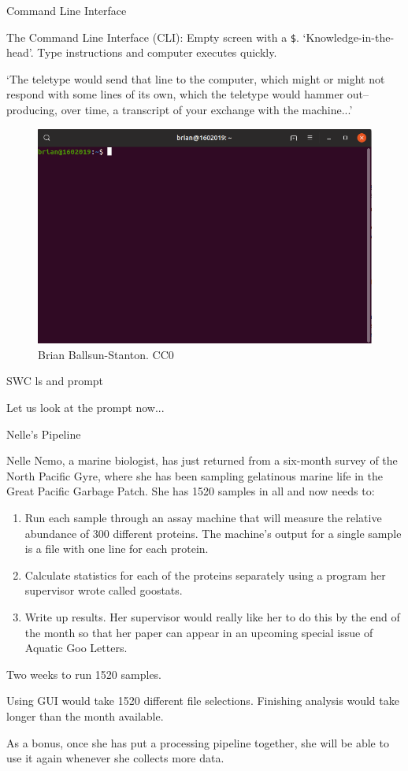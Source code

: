 \documentclass[aspectratio=1610, 11pt]{beamer} %
\begin{document}
\begin{frame}{Command Line Interface}

    The Command Line Interface (CLI): Empty screen with a {\tt \$}. `Knowledge-in-the-head'\cite{Norman2013-xk}. Type instructions and computer executes quickly.

`The teletype would send that line to
the computer, which might or might not respond with some lines of its own, which the
teletype would hammer out–producing, over time, a transcript of your exchange with
the machine...' \cite{Stephenson1999-fw}

    
     \begin{figure}[H]

     \includegraphics[width=.3\textwidth]{figures/terminal.png}
        \caption{Brian Ballsun-Stanton. CC0}
        \label{fig:cli}
        \end{figure}

\end{frame}
\begin{frame}{SWC ls and prompt}

Let us look at the prompt now...
\end{frame}

\begin{frame}{Nelle's Pipeline}

Nelle Nemo, a marine biologist, has just returned from a six-month survey of the North Pacific Gyre, where she has been sampling gelatinous marine life in the Great Pacific Garbage Patch. She has 1520 samples in all and now needs to:
\begin{enumerate}[label=\arabic*)]
    \item Run each sample through an assay machine that will measure the relative abundance of 300 different proteins. The machine’s output for a single sample is a file with one line for each protein.
    \item Calculate statistics for each of the proteins separately using a program her supervisor wrote called goostats.
    \item Write up results. Her supervisor would really like her to do this by the end of the month so that her paper can appear in an upcoming special issue of Aquatic Goo Letters.
\end{enumerate}

Two weeks to run 1520 samples.     

Using GUI would take 1520 different file selections. Finishing analysis would take longer than the month available.


As a bonus, once she has put a processing pipeline together, she will be able to use it again whenever she collects more data.
\end{frame}
\end{document}

